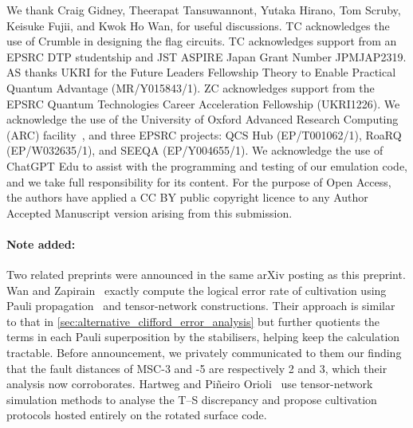 \documentclass[a4paper,unpublished,onecolumn]{quantumarticle}
\theoremstyle{definition}
\theoremstyle{remark}
\begin{document}
\begin{acknowledgments}
We thank
Craig Gidney,
Theerapat Tansuwannont,
Yutaka Hirano,
Tom Scruby,
Keisuke Fujii,
and Kwok Ho Wan,
for useful discussions.
TC acknowledges the use of Crumble
in designing the flag circuits.
TC acknowledges support from
an EPSRC DTP studentship and
JST ASPIRE Japan Grant Number JPMJAP2319.
AS thanks UKRI for the Future Leaders Fellowship Theory to Enable Practical Quantum Advantage (MR/Y015843/1). ZC acknowledges support from the EPSRC Quantum Technologies Career Acceleration Fellowship (UKRI1226).
We acknowledge
the use of
the University of Oxford Advanced Research Computing
(ARC)
facility~\cite{Richards2015_quantum_bibstyle},
and three EPSRC projects:
QCS Hub (EP/T001062/1),
RoaRQ (EP/W032635/1),
and SEEQA (EP/Y004655/1). 
We acknowledge the use of ChatGPT Edu
to assist with the programming and testing
of our emulation code,
and we take full responsibility for its content.
For the purpose of Open Access, the authors have applied a CC BY public copyright licence to any Author Accepted Manuscript version arising from this submission.
\end{acknowledgments}

\paragraph{Note added:}
Two related preprints were announced in the same arXiv posting as this preprint.
Wan and Zapirain~\cite{Wan2026a} exactly compute the logical error rate of
cultivation using Pauli propagation~\cite{Rudolph2026}
and tensor-network constructions.
Their approach is similar to that in \cref{sec:alternative_clifford_error_analysis}
but further quotients the terms in each Pauli superposition by the stabilisers,
helping keep the calculation tractable.
Before announcement,
we privately communicated to them our finding that
the fault distances of MSC-3 and -5 are respectively 2 and 3,
which their analysis now corroborates.
Hartweg and Piñeiro Orioli~\cite{Hartweg2026} use tensor-network simulation methods
to analyse the T--S discrepancy and propose cultivation protocols
hosted entirely on the rotated surface code.




\appendix









\end{document}
